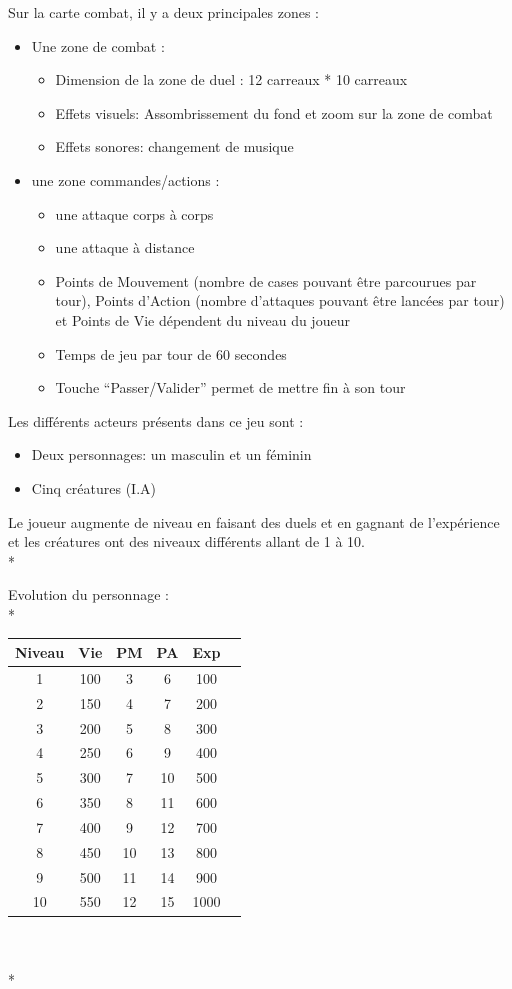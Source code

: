 \documentclass[11pt, a4paper]{article}
\begin{document}
Sur la carte combat, il y a deux principales zones :

\begin{itemize}
\item Une zone de combat : 
	\begin{itemize}
	\item Dimension de la zone de duel : 12 carreaux * 10 carreaux
	\item Effets visuels: Assombrissement du fond et zoom sur la zone de combat
	\item Effets sonores: changement de musique
	\end{itemize}
\item une zone commandes/actions :
	\begin{itemize}
	\item une attaque corps à corps
	\item une attaque à distance
	\item Points de Mouvement (nombre de cases pouvant être parcourues par tour), Points d’Action (nombre d’attaques pouvant être lancées par tour) et Points de Vie dépendent du niveau du joueur
	\item Temps de jeu par tour de 60 secondes
	\item Touche “Passer/Valider” permet de mettre fin à son tour
	\end{itemize}
\end{itemize}

Les différents acteurs présents dans ce jeu sont :
	
\begin{itemize}
\item Deux personnages: un masculin et un féminin
\item Cinq créatures (I.A)
\end{itemize}

Le joueur augmente de niveau en faisant des duels et en gagnant de l’expérience et les créatures ont des niveaux différents allant de 1 à 10.\\*

Evolution du personnage :\\*

\begin{tabular}{|c|c|c|c|c|c|}
\hline
	Niveau & Vie & PM & PA & Exp \\
\hline
   1 & 100 & 3 & 6 & 100 \\
\hline
   2 & 150 & 4 & 7 & 200 \\
\hline
   3 & 200 & 5 & 8 & 300 \\
\hline
   4 & 250 & 6 & 9 & 400 \\
\hline
   5 & 300 & 7 & 10 & 500 \\
\hline
   6 & 350 & 8 & 11 & 600 \\
\hline
   7 & 400 & 9 & 12 & 700 \\
\hline
   8 & 450 & 10 & 13 & 800 \\
\hline
   9 & 500 & 11 & 14 & 900 \\
\hline
   10 & 550 & 12 & 15 & 1000 \\
 \hline 
\end{tabular}\\ \\*
\end{document}
